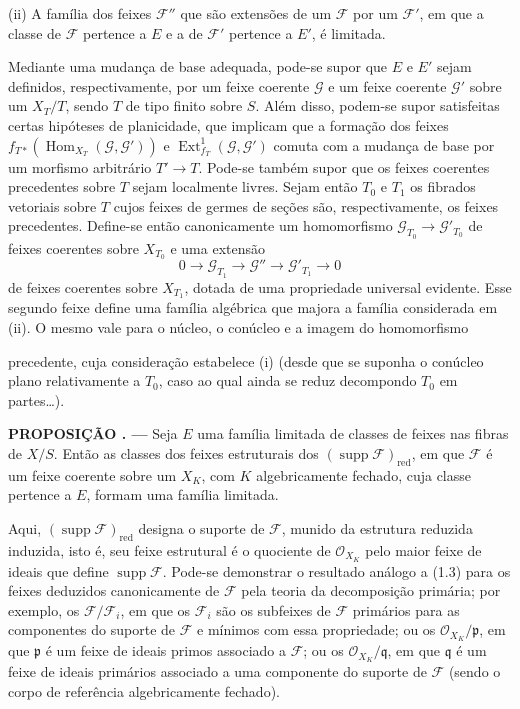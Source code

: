 \documentclass[11pt,twoside,openany]{book}
\numberwithin{equation}{section}
\newcommand{\src}[1]{%
  \phantomsection\hypertarget{src:#1}{}%
  \marginpar{\raggedleft\footnotesize\sffamily #1}%
}
\theoremstyle{plain}
\theoremstyle{definition}
\theoremstyle{remark}
\newcommand{\result}[2]{%
  \par\medskip\noindent\textbf{#1%
  \if\relax\detokenize{#2}\relax\else\space#2\fi. ---}\enspace
}
\newcommand{\FgaUnitKey}{frontmatter}
\renewcommand{\src}[1]{%
  \phantomsection\hypertarget{src:\FgaUnitKey:#1}{}%
  \marginpar{\raggedleft\footnotesize\sffamily #1}%
}
\begin{document}
\smallskip
\noindent (ii) A família dos feixes $\mathcal F''$ que são extensões de um
$\mathcal F$ por um $\mathcal F'$, em que a classe de $\mathcal F$ pertence
a $E$ e a de $\mathcal F'$ pertence a $E'$, é limitada.

Mediante uma mudança de base adequada, pode-se supor que $E$ e $E'$ sejam
definidos, respectivamente, por um feixe coerente $\mathcal G$ e um feixe
coerente $\mathcal G'$ sobre um $X_T/T$, sendo $T$ de tipo finito sobre $S$.
Além disso, podem-se supor satisfeitas certas hipóteses de planicidade, que
implicam que a formação dos feixes
$f_{T*}(\operatorname{Hom}_{X_T}(\mathcal G,\mathcal G'))$ e
$\operatorname{Ext}^{1}_{f_T}(\mathcal G,\mathcal G')$ comuta com a mudança
de base por um morfismo arbitrário $T'\longrightarrow T$. Pode-se também
supor que os feixes coerentes precedentes sobre $T$ sejam localmente livres.
Sejam então $T_0$ e $T_1$ os fibrados vetoriais sobre $T$ cujos feixes de
germes de seções são, respectivamente, os feixes precedentes. Define-se então
canonicamente um homomorfismo
$\mathcal G_{T_0}\longrightarrow\mathcal G'_{T_0}$ de feixes coerentes sobre
$X_{T_0}$ e uma extensão
\[
0\longrightarrow\mathcal G_{T_1}\longrightarrow\mathcal G''
\longrightarrow\mathcal G'_{T_1}\longrightarrow0
\]
de feixes coerentes sobre $X_{T_1}$, dotada de uma propriedade universal
evidente. Esse segundo feixe define uma família algébrica que majora a família
considerada em (ii). O mesmo vale para o núcleo, o conúcleo e a imagem do
homomorfismo
\src{253}
precedente, cuja consideração estabelece (i) (desde que se suponha o conúcleo
plano relativamente a $T_0$, caso ao qual ainda se reduz decompondo $T_0$ em
partes\ldots).

\result{PROPOSIÇÃO}{1.3} Seja $E$ uma família limitada de classes de feixes
nas fibras de $X/S$. Então as classes dos feixes estruturais dos
$(\operatorname{supp}\mathcal F)_{\mathrm{red}}$, em que $\mathcal F$ é um
feixe coerente sobre um $X_K$, com $K$ algebricamente fechado, cuja classe
pertence a $E$, formam uma família limitada.

Aqui, $(\operatorname{supp}\mathcal F)_{\mathrm{red}}$ designa o suporte de
$\mathcal F$, munido da estrutura reduzida induzida, isto é, seu feixe
estrutural é o quociente de $\mathcal O_{X_K}$ pelo maior feixe de ideais que
define $\operatorname{supp}\mathcal F$. Pode-se demonstrar o resultado
análogo a (1.3) para os feixes deduzidos canonicamente de $\mathcal F$ pela
teoria da decomposição primária; por exemplo, os
$\mathcal F/\mathcal F_i$, em que os $\mathcal F_i$ são os subfeixes de
$\mathcal F$ primários para as componentes do suporte de $\mathcal F$ e
mínimos com essa propriedade; ou os $\mathcal O_{X_K}/\mathfrak p$, em que
$\mathfrak p$ é um feixe de ideais primos associado a $\mathcal F$; ou os
$\mathcal O_{X_K}/\mathfrak q$, em que $\mathfrak q$ é um feixe de ideais
primários associado a uma componente do suporte de $\mathcal F$ (sendo o
corpo de referência algebricamente fechado).
\end{document}

